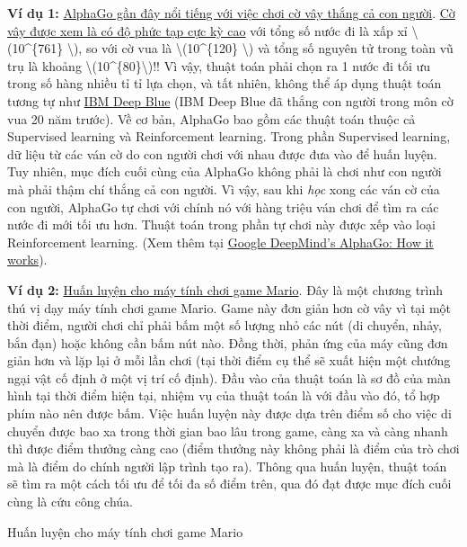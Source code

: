 \textbf{Ví dụ 1:}
\href{https://gogameguru.com/tag/deepmind-alphago-lee-sedol/}{AlphaGo
gần đây nổi tiếng với việc chơi cờ vây thắng cả con người}.
\href{https://www.tastehit.com/blog/google-deepmind-alphago-how-it-works/}{Cờ
vây được xem là có độ phức tạp cực kỳ cao} với tổng số nước đi là xấp xỉ
\textbackslash{}(10\^{}\{761\} \textbackslash{}), so với cờ vua là
\textbackslash{}(10\^{}\{120\} \textbackslash{}) và tổng số nguyên tử
trong toàn vũ trụ là khoảng
\textbackslash{}(10\^{}\{80\}\textbackslash{})!! Vì vậy, thuật toán phải
chọn ra 1 nước đi tối ưu trong số hàng nhiều tỉ tỉ lựa chọn, và tất
nhiên, không thể áp dụng thuật toán tương tự như
\href{https://en.wikipedia.org/wiki/Deep_Blue_(chess_computer)}{IBM Deep
Blue} (IBM Deep Blue đã thắng con người trong môn cờ vua 20 năm trước).
Về cơ bản, AlphaGo bao gồm các thuật toán thuộc cả Supervised learning
và Reinforcement learning. Trong phần Supervised learning, dữ liệu từ
các ván cờ do con người chơi với nhau được đưa vào để huấn luyện. Tuy
nhiên, mục đích cuối cùng của AlphaGo không phải là chơi như con người
mà phải thậm chí thắng cả con người. Vì vậy, sau khi \emph{học} xong các
ván cờ của con người, AlphaGo tự chơi với chính nó với hàng triệu ván
chơi để tìm ra các nước đi mới tối ưu hơn. Thuật toán trong phần tự chơi
này được xếp vào loại Reinforcement learning. (Xem thêm tại
\href{https://www.tastehit.com/blog/google-deepmind-alphago-how-it-works/}{Google
DeepMind's AlphaGo: How it works}).

\textbf{Ví dụ 2:}
\href{https://www.youtube.com/watch?v=qv6UVOQ0F44}{Huấn luyện cho máy
tính chơi game Mario}. Đây là một chương trình thú vị dạy máy tính chơi
game Mario. Game này đơn giản hơn cờ vây vì tại một thời điểm, người
chơi chỉ phải bấm một số lượng nhỏ các nút (di chuyển, nhảy, bắn đạn)
hoặc không cần bấm nút nào. Đồng thời, phản ứng của máy cũng đơn giản
hơn và lặp lại ở mỗi lần chơi (tại thời điểm cụ thể sẽ xuất hiện một
chướng ngại vật cố định ở một vị trí cố định). Đầu vào của thuật toán là
sơ đồ của màn hình tại thời điểm hiện tại, nhiệm vụ của thuật toán là
với đầu vào đó, tổ hợp phím nào nên được bấm. Việc huấn luyện này được
dựa trên điểm số cho việc di chuyển được bao xa trong thời gian bao lâu
trong game, càng xa và càng nhanh thì được điểm thưởng càng cao (điểm
thưởng này không phải là điểm của trò chơi mà là điểm do chính người lập
trình tạo ra). Thông qua huấn luyện, thuật toán sẽ tìm ra một cách tối
ưu để tối đa số điểm trên, qua đó đạt được mục đích cuối cùng là cứu
công chúa.

Huấn luyện cho máy tính chơi game Mario

